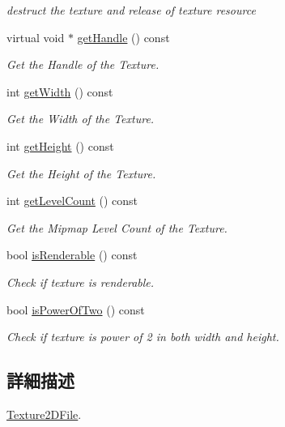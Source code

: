 \begin{DoxyCompactItemize}
\begin{DoxyCompactList}\small\item\em destruct the texture and release of texture resource \end{DoxyCompactList}\item 
virtual void $\ast$ \hyperlink{class_magnum_1_1_texture2_d_file_aa241beb38e56db60cfc10ae1a6d5daf5}{get\+Handle} () const 
\begin{DoxyCompactList}\small\item\em Get the Handle of the Texture. \end{DoxyCompactList}\item 
int \hyperlink{class_magnum_1_1_texture2_d_file_a2e5f9cb55744368e5e94deb84b26b388}{get\+Width} () const 
\begin{DoxyCompactList}\small\item\em Get the Width of the Texture. \end{DoxyCompactList}\item 
int \hyperlink{class_magnum_1_1_texture2_d_file_a05e993091cc066e9fe5787aec1b54d31}{get\+Height} () const 
\begin{DoxyCompactList}\small\item\em Get the Height of the Texture. \end{DoxyCompactList}\item 
int \hyperlink{class_magnum_1_1_texture2_d_file_a9b8508dcda5bfcf4e46779339b1d9a32}{get\+Level\+Count} () const 
\begin{DoxyCompactList}\small\item\em Get the Mipmap Level Count of the Texture. \end{DoxyCompactList}\item 
bool \hyperlink{class_magnum_1_1_texture2_d_file_ab962fa37ff37401b463651dfaf08db5d}{is\+Renderable} () const 
\begin{DoxyCompactList}\small\item\em Check if texture is renderable. \end{DoxyCompactList}\item 
bool \hyperlink{class_magnum_1_1_texture2_d_file_a609bb7859923c2812ae03318507f1a6c}{is\+Power\+Of\+Two} () const 
\begin{DoxyCompactList}\small\item\em Check if texture is power of 2 in both width and height. \end{DoxyCompactList}\end{DoxyCompactItemize}


\subsection{詳細描述}
\hyperlink{class_magnum_1_1_texture2_d_file}{Texture2\+D\+File}. 

